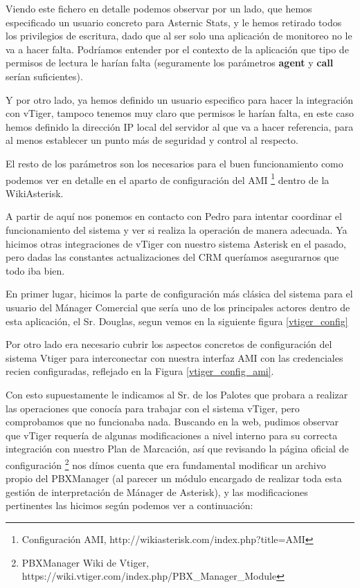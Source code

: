 Viendo este fichero en detalle podemos observar por un lado, que hemos especificado un usuario concreto para Asternic Stats, y le hemos retirado todos los privilegios de escritura, dado que al ser solo una aplicación de monitoreo no le va a hacer falta. Podríamos entender por el contexto de la aplicación que tipo de permisos de lectura le harían falta (seguramente los parámetros \textbf{agent} y \textbf{call} serían suficientes).

Y por otro lado, ya hemos definido un usuario especifico para hacer la integración con vTiger, tampoco tenemos muy claro que permisos le harían falta, en este caso hemos definido la dirección IP local del servidor al que va a hacer referencia, para al menos establecer un punto más de seguridad y control al respecto.

El resto de los parámetros son los necesarios para el buen funcionamiento como podemos ver en detalle en el aparto de configuración del AMI \footnote{Configuración AMI, http://wikiasterisk.com/index.php?title=AMI} dentro de la WikiAsterisk.

A partir de aquí nos ponemos en contacto con Pedro para intentar coordinar el funcionamiento del sistema y ver si realiza la operación de manera adecuada. Ya hicimos otras integraciones de vTiger con nuestro sistema Asterisk en el pasado, pero dadas las constantes actualizaciones del CRM queríamos asegurarnos que todo iba bien.

En primer lugar, hicimos la parte de configuración más clásica del sistema para el usuario del Mánager Comercial que sería uno de los principales actores dentro de esta aplicación, el Sr. Douglas, segun vemos en la siguiente figura \ref{vtiger_config}


Por otro lado era necesario cubrir los aspectos concretos de configuración del sistema Vtiger para interconectar con nuestra interfaz AMI con las credenciales recien configuradas, reflejado en la Figura \ref{vtiger_config_ami}.


Con esto supuestamente le indicamos al Sr. de los Palotes que probara a realizar las operaciones que conocía para trabajar con el sistema vTiger, pero comprobamos que no funcionaba nada. Buscando en la web, pudimos observar que vTiger requería de algunas modificaciones a nivel interno para su correcta integración con nuestro Plan de Marcación, así que revisando la página oficial de configuración \footnote{PBXManager Wiki de Vtiger, https://wiki.vtiger.com/index.php/PBX\_Manager\_Module} nos dímos cuenta que era fundamental modificar un archivo propio del PBXManager (al parecer un módulo encargado de realizar toda esta gestión de interpretación de Mánager de Asterisk), y las modificaciones pertinentes las hicimos según podemos ver a continuación:

